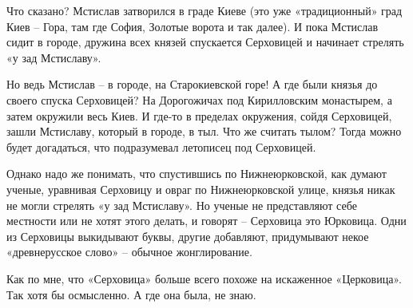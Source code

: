 Что сказано? Мстислав затворился в граде Киеве (это уже «традиционный» град Киев – Гора, там где София, Золотые ворота и так далее). И пока Мстислав сидит в городе, дружина всех князей спускается Серховицей и начинает стрелять «у зад Мстиславу».

Но ведь Мстислав – в городе, на Старокиевской горе! А где были князья до своего спуска Серховицей? На Дорогожичах под Кирилловским монастырем, а затем окружили весь Киев. И где-то в пределах окружения, сойдя Серховицей, зашли Мстиславу, который в городе, в тыл. Что же считать тылом? Тогда можно будет догадаться, что подразумевал летописец под Серховицей.

Однако надо же понимать, что спустившись по Нижнеюрковской, как думают ученые, уравнивая Серховицу и овраг по Нижнеюрковской улице, князья никак не могли стрелять «у зад Мстиславу». Но ученые не представляют себе местности или не хотят этого делать, и говорят – Серховица это Юрковица. Одни из Серховицы выкидывают буквы, другие добавляют, придумывают некое «древнерусское слово» – обычное жонглирование. 

Как по мне, что «Серховица» больше всего похоже на искаженное «Церковица». Так хотя бы осмысленно. А где она была, не знаю.
